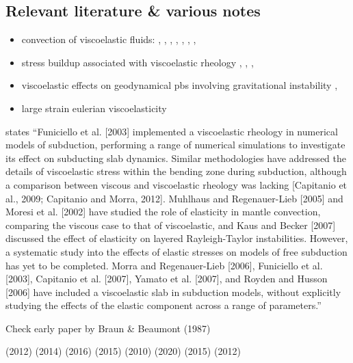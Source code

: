 \subsection{Relevant literature \& various notes}



\begin{itemize}
\item convection of viscoelastic fluids: 
\textcite{hard91}, \textcite{momy93}, 
\textcite{zhgm96}, \textcite{modm02}, 
\textcite{mure05}, \textcite{likh05a},  
\textcite{likh05b}, \textcite{fukk08}


\item stress buildup associated with viscoelastic rheology 
\textcite{kubo77}, \textcite{kupa84}, \textcite{pocp93}, \textcite{mapo09}

\item viscoelastic effects on geodynamical pbs involving gravitational instability 
\textcite{pocp93,kabe07,bumo08,scbe08}, 
\textcite{hamy95} 

\item large strain  eulerian viscoelasticity 
\textcite{scps01,vapy01,coll06,moql07,fukk08,poso08}

\end{itemize}

\textcite{famc14} states 
``Funiciello et al. [2003] implemented a viscoelastic rheology in numerical models of subduction, performing a
range of numerical simulations to investigate its effect on subducting slab dynamics. Similar methodologies have addressed the details of viscoelastic stress within the bending zone during subduction, although a comparison between viscous and viscoelastic rheology was lacking [Capitanio et al., 2009; Capitanio and Morra, 2012].
Muhlhaus and Regenauer-Lieb [2005] and Moresi et al. [2002] have studied the role of elasticity in mantle convection, comparing the viscous case to that of viscoelastic, and Kaus and Becker [2007] discussed the effect of elasticity on layered Rayleigh-Taylor instabilities. However, a systematic study into the effects of elastic stresses on models of free subduction has yet to be completed. Morra and Regenauer-Lieb [2006], Funiciello et al. [2003], Capitanio et al. [2007], Yamato et al. [2007], and Royden and Husson [2006] have included a viscoelastic slab in subduction models, without explicitly studying the effects of the elastic component across a range of parameters.''


Check early paper by Braun \& Beaumont (1987) \cite{brbe87}

\textcite{asmo12} (2012)
\textcite{hepk14} (2014)
\textcite{daws16} (2016)
\textcite{thkp15} (2015)
\textcite{beps10} (2010)
\textcite{samb20} (2020)
\textcite{vosc15} (2015)
\textcite{nalr12} (2012)
